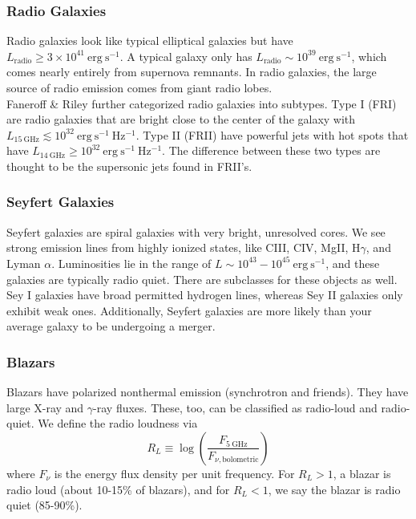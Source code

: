\documentclass[10pt]{article}
\numberwithin{equation}{section}
\newcommand{\n}{\noindent}
\begin{document}
	\subsubsection{Radio Galaxies} %
	\label{ssub:radio_galaxies}
		Radio galaxies look like typical elliptical galaxies but have $L_{\mathrm{radio}}\geq 3\times 10^{41}\ \mathrm{erg\ s^{-1}}$. A typical galaxy only has $L_{\mathrm{radio}}\sim 10^{39}\ \mathrm{erg\ s^{-1}}$, which comes nearly entirely from supernova remnants. In radio galaxies, the large source of radio emission comes from giant radio lobes.\\
		
		\n Faneroff \& Riley further categorized radio galaxies into subtypes. Type I (FRI) are radio galaxies that are bright close to the center of the galaxy with $L_{15\ \mathrm{GHz}}\lesssim 10^{32}\ \mathrm{erg\ s^{-1}\ Hz^{-1}}$. Type II (FRII) have powerful jets with hot spots that have $L_{14\ \mathrm{GHz}} \geq 10^{32}\ \mathrm{erg\ s^{-1}\ Hz^{-1}}$. The difference between these two types are thought to be the supersonic jets found in FRII's.
	\subsubsection{Seyfert Galaxies} %
	\label{ssub:seyfert_galaxies}
	Seyfert galaxies are spiral galaxies with very bright, unresolved cores. We see strong emission lines from highly ionized states, like CIII, CIV, MgII, H$\gamma$, and Lyman $\alpha$. Luminosities lie in the range of $L\sim 10^{43}-10^{45}\ \mathrm{erg\ s^{-1}}$, and these galaxies are typically radio quiet. There are subclasses for these objects as well. Sey I galaxies have broad permitted hydrogen lines, whereas Sey II galaxies only exhibit weak ones. Additionally, Seyfert galaxies are more likely than your average galaxy to be undergoing a merger.
	\subsubsection{Blazars} %
	\label{ssub:blazars}
	Blazars have polarized nonthermal emission (synchrotron and friends). They have large X-ray and $\gamma$-ray fluxes. These, too, can be classified as radio-loud and radio-quiet. We define the radio loudness via
	\begin{equation}
		\label{eq:blazar:1} R_L \equiv \log\left(\frac{F_{5\ \mathrm{GHz}}}{F_{\nu,\mathrm{bolometric}}}\right)
	\end{equation}
	where $F_\nu$ is the energy flux density per unit frequency. For $R_L>1$, a blazar is radio loud (about 10-15\% of blazars), and for $R_L<1$, we say the blazar is radio quiet (85-90\%).	
\end{document}
